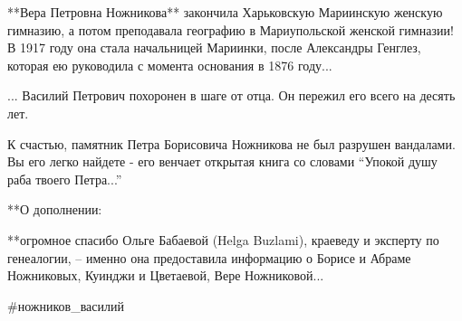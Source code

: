 **Вера Петровна Ножникова** закончила Харьковскую Мариинскую женскую гимназию,
а потом преподавала географию в Мариупольской женской гимназии! В 1917 году она
стала начальницей Мариинки, после Александры Генглез, которая ею руководила с
момента основания в 1876 году...

... Василий Петрович похоронен в шаге от отца. Он пережил его всего на десять
лет.

К счастью, памятник Петра Борисовича Ножникова не был разрушен вандалами. Вы
его легко найдете - его венчает открытая книга со словами \enquote{Упокой душу раба
твоего Петра...}

**О дополнении: 

**огромное спасибо Ольге Бабаевой (Helga Buzlami), краеведу и
эксперту по генеалогии, – именно она предоставила информацию о Борисе и Абраме
Ножниковых, Куинджи и Цветаевой, Вере Ножниковой...

\#ножников\_василий

